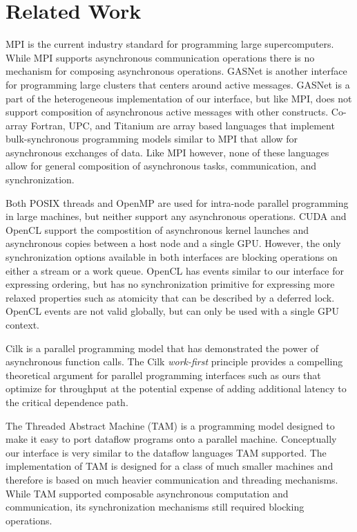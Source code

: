 
\section{Related Work}
\label{sec:related}

MPI is the current industry standard for programming large
supercomputers\cite{MPI}.  While MPI supports asynchronous
communication operations there is no mechanism for composing
asynchronous operations.  GASNet is another interface for programming
large clusters that centers around active messages\cite{GASNET07}.  GASNet
is a part of the heterogeneous implementation of our interface, but like
MPI, does not support composition of asynchronous active messages with
other constructs.  Co-array Fortran, UPC, and Titanium
are array based languages that implement bulk-synchronous
programming models similar to MPI that allow for asynchronous
exchanges of data\cite{COARRAY_FORTRAN,UPC99,JV:Yel98}.  Like
MPI however, none of these languages allow for general composition
of asynchronous tasks, communication, and synchronization.

Both POSIX threads and OpenMP\cite{OPENMP98} are used for intra-node parallel
programming in large machines, but neither support any asynchronous
operations.  CUDA\cite{CUDA} and OpenCL\cite{Khronos:OpenCL} support
the compostition of asynchronous kernel launches and asynchronous copies
between a host node and a single GPU.  However, the only synchronization
options available in both interfaces are blocking operations on either
a stream or a work queue.  OpenCL has events similar to our interface for
expressing ordering, but has no synchronization primitive for expressing
more relaxed properties such as atomicity that can be described by a
deferred lock.  OpenCL events are not valid globally, but can only be
used with a single GPU context.

Cilk is a parallel programming model that has demonstrated the power of
asynchronous function calls\cite{CILK95}.  The Cilk {\em work-first}
principle provides a compelling theoretical argument for parallel programming
interfaces such as ours that optimize for throughput at the potential
expense of adding additional latency to the critical 
dependence path\cite{Frigo98}.

The Threaded Abstract Machine (TAM) is a programming model designed to
make it easy to port dataflow programs onto a parallel machine\cite{CullerGSvE93}.  
Conceptually our interface is very similar to the dataflow languages TAM supported.
The implementation of TAM is designed for a class of much smaller machines
and therefore is based on much heavier communication and threading mechanisms.
While TAM supported composable asynchronous computation and communication, its
synchronization mechanisms still required blocking operations.

